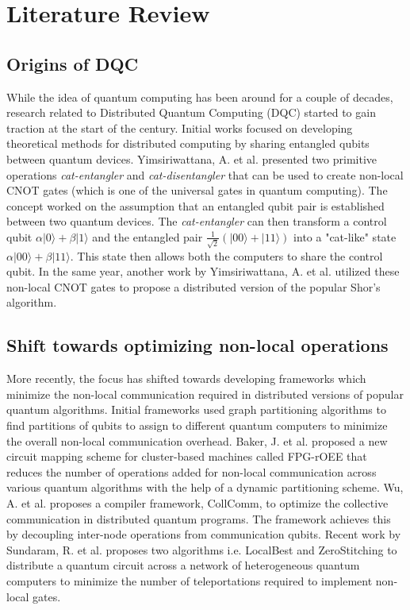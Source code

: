 \section{Literature Review}
\label{chap:lit-review}


\vspace{\baselineskip}

\subsection{Origins of DQC}

While the idea of quantum computing has been around for a couple of decades, research related to Distributed Quantum Computing (DQC) started to gain traction at the start of the century. Initial works focused on developing theoretical methods for distributed computing by sharing entangled qubits between quantum devices. Yimsiriwattana, A. et al. \cite{yimsiriwattana2004generalized} presented two primitive operations \emph{cat-entangler} and \emph{cat-disentangler} that can be used to create non-local CNOT gates (which is one of the universal gates in quantum computing). The concept worked on the assumption that an entangled qubit pair is established between two quantum devices. The \emph{cat-entangler} can then transform a control qubit $\alpha|0\rangle + \beta|1\rangle$ and the entangled pair $\frac{1}{\sqrt{2}}(|00\rangle + |11\rangle)$ into a "cat-like" state $\alpha|00\rangle+\beta|11\rangle$. This state then allows both the computers to share the control qubit. In the same year, another work by Yimsiriwattana, A. et al. \cite{yimsiriwattana2004distributed} utilized these non-local CNOT gates to propose a distributed version of the popular Shor's algorithm. \par

\subsection{Shift towards optimizing non-local operations}

More recently, the focus has shifted towards developing frameworks which minimize the non-local communication required in distributed versions of popular quantum algorithms. Initial frameworks used graph partitioning algorithms to find partitions of qubits to assign to different quantum computers to minimize the overall non-local communication overhead. Baker, J. et al. \cite{baker2020time} proposed a new circuit mapping scheme for cluster-based machines called FPG-rOEE that reduces the number of operations added for non-local communication across various quantum algorithms with the help of a dynamic partitioning scheme. Wu, A. et al. \cite{wu2022collcomm} proposes a compiler framework, CollComm, to optimize the collective communication in distributed quantum programs. The framework achieves this by decoupling inter-node operations from communication qubits. Recent work by Sundaram, R. et al. \cite{sundaram2023distributing} proposes two algorithms i.e. LocalBest and ZeroStitching to distribute a quantum circuit across a network of heterogeneous quantum computers to minimize the number of teleportations required to implement non-local gates. \par

